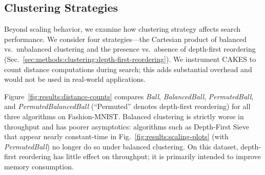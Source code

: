 \subsection{Clustering Strategies}
\label{sec:results:clustering-strategies-and-number-of-distance-computations}

Beyond scaling behavior, we examine how clustering strategy affects search performance.
We consider four strategies—the Cartesian product of balanced vs.\ unbalanced clustering and the presence vs.\ absence of depth-first reordering (Sec.~\ref{sec:methods:clustering:depth-first-reordering}).
We instrument CAKES to count distance computations during search;
this adds substantial overhead and would not be used in real-world applications.

Figure~\ref{fig:results:distance-counts} compares \textit{Ball}, \textit{BalancedBall}, \textit{PermutedBall}, and \textit{PermutedBalancedBall} (``Permuted'' denotes depth-first reordering) for all three algorithms on Fashion-MNIST.
Balanced clustering is strictly worse in throughput and has poorer asymptotics: algorithms such as Depth-First Sieve that appear nearly constant-time in Fig.~\ref{fig:results:scaling-plots} (with \textit{PermutedBall}) no longer do so under balanced clustering.
On this dataset, depth-first reordering has little effect on throughput; it is primarily intended to improve memory consumption.

